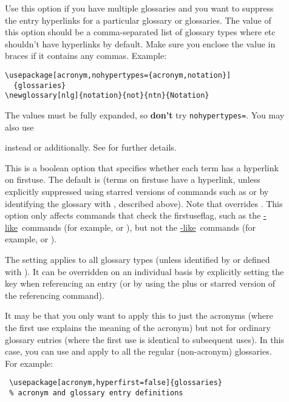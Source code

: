 \documentclass[report,inlinetitle]{nlctdoc}
\newcommand{\glslike}{\hyperref[sec:gls-like]{\cs{gls}-like}}
\newcommand{\glstextlike}{\hyperref[sec:glstext-like]{\cs{glstext}-like}}
\newcommand*{\firstuse}{\gls{firstuse}}
\newcommand*{\firstuseflag}{\gls{firstuseflag}}
\newcommand*{\gloskey}[2][newglossaryentry]{\csopt{#1}{#2}}
\begin{document}
\begin{description}
\item[] Use this option if you have multiple
glossaries and you want to suppress the entry hyperlinks for a
particular glossary or glossaries. The value of this option should
be a comma-separated list of glossary types where  etc
shouldn't have hyperlinks by default. Make sure you enclose the
value in braces if it contains any commas. Example:
\begin{verbatim}
\usepackage[acronym,nohypertypes={acronym,notation}]
  {glossaries}
\newglossary[nlg]{notation}{not}{ntn}{Notation}
\end{verbatim}
The values must be fully expanded, so \textbf{don't} try
\texttt{nohypertypes\discretionary{}{}{}=}. You may also use
\begin{definition}
\end{definition}
instead or additionally.
See  for further details.

\item[] This is a boolean option that specifies
whether each term has a hyperlink on \firstuse. The default is 
 (terms on \gls{firstuse} have a hyperlink, 
unless explicitly suppressed using starred versions of commands
such as  or by identifying the glossary with 
, described above). Note that
 overrides .
This option only affects commands that check the \firstuseflag, such
as the \glslike\ commands (for example,  or
), but not the \glstextlike\ commands
(for example,  or ). 

The  setting applies to
all glossary types (unless identified by  or
defined with ). It can be overridden on an
individual basis by explicitly setting the \gloskey[glslink]{hyper} key
when referencing an entry (or by using the plus or starred
version of the referencing command).

It may be that you only want to apply this to just the acronyms
(where the first use explains the meaning of the acronym) but not
for ordinary glossary entries (where the first use is identical to
subsequent uses). In this case, you can use  and
apply  to all the regular (non-acronym) glossaries.
For example:
\begin{verbatim}
 \usepackage[acronym,hyperfirst=false]{glossaries}
 % acronym and glossary entry definitions


\end{verbatim}
\end{description}
\end{document}
